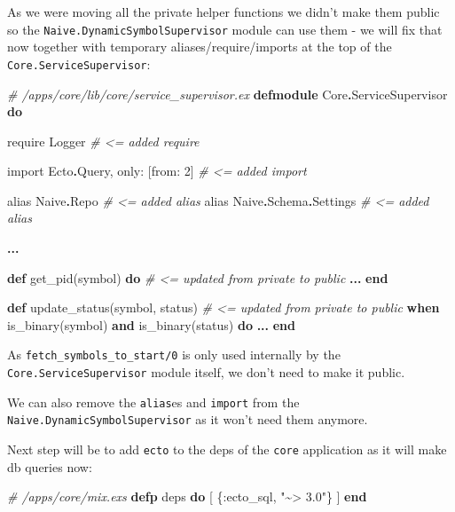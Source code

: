 \documentclass[
  oneside]{book}
\newenvironment{Shaded}{\begin{snugshade}}{\end{snugshade}}
\newcommand{\CommentTok}[1]{\textcolor[rgb]{0.56,0.35,0.01}{\textit{#1}}}
\newcommand{\ConstantTok}[1]{\textcolor[rgb]{0.00,0.00,0.00}{#1}}
\newcommand{\DecValTok}[1]{\textcolor[rgb]{0.00,0.00,0.81}{#1}}
\newcommand{\ImportTok}[1]{#1}
\newcommand{\KeywordTok}[1]{\textcolor[rgb]{0.13,0.29,0.53}{\textbf{#1}}}
\newcommand{\NormalTok}[1]{#1}
\newcommand{\OperatorTok}[1]{\textcolor[rgb]{0.81,0.36,0.00}{\textbf{#1}}}
\newcommand{\StringTok}[1]{\textcolor[rgb]{0.31,0.60,0.02}{#1}}
\newcommand{\VariableTok}[1]{\textcolor[rgb]{0.00,0.00,0.00}{#1}}
\begin{document}
As we were moving all the private helper functions we didn't make them public so the \texttt{Naive.DynamicSymbolSupervisor} module can use them - we will fix that now together with temporary aliases/require/imports at the top of the \texttt{Core.ServiceSupervisor}:

\begin{Shaded}
\begin{Highlighting}[]
\CommentTok{\# /apps/core/lib/core/service\_supervisor.ex}
\KeywordTok{defmodule} \ConstantTok{Core}\OperatorTok{.}\ConstantTok{ServiceSupervisor} \KeywordTok{do}

  \ImportTok{require} \ConstantTok{Logger}                     \CommentTok{\# \textless{}= added require}

  \ImportTok{import} \ConstantTok{Ecto}\OperatorTok{.}\ConstantTok{Query}\NormalTok{, }\VariableTok{only:}\NormalTok{ [}\VariableTok{from:} \DecValTok{2}\NormalTok{] }\CommentTok{\# \textless{}= added import}

  \ImportTok{alias} \ConstantTok{Naive}\OperatorTok{.}\ConstantTok{Repo}                   \CommentTok{\# \textless{}= added alias}
  \ImportTok{alias} \ConstantTok{Naive}\OperatorTok{.}\ConstantTok{Schema}\OperatorTok{.}\ConstantTok{Settings}        \CommentTok{\# \textless{}= added alias}

  \OperatorTok{...}

  \KeywordTok{def}\NormalTok{ get\_pid(symbol) }\KeywordTok{do} \CommentTok{\# \textless{}= updated from private to public}
    \OperatorTok{...}
  \KeywordTok{end}

  \KeywordTok{def}\NormalTok{ update\_status(symbol, status) }\CommentTok{\# \textless{}= updated from private to public}
      \KeywordTok{when}\NormalTok{ is\_binary(symbol) }\KeywordTok{and}\NormalTok{ is\_binary(status) }\KeywordTok{do}
    \OperatorTok{...}
  \KeywordTok{end}
\end{Highlighting}
\end{Shaded}

As \texttt{fetch\_symbols\_to\_start/0} is only used internally by the \texttt{Core.ServiceSupervisor} module itself, we don't need to make it public.

We can also remove the \texttt{alias}es and \texttt{import} from the \texttt{Naive.DynamicSymbolSupervisor} as it won't need them anymore.

Next step will be to add \texttt{ecto} to the deps of the \texttt{core} application as it will make db queries now:

\begin{Shaded}
\begin{Highlighting}[]
  \CommentTok{\# /apps/core/mix.exs}
  \KeywordTok{defp}\NormalTok{ deps }\KeywordTok{do}
\NormalTok{    [}
\NormalTok{      \{}\VariableTok{:ecto\_sql}\NormalTok{, }\StringTok{"\textasciitilde{}\textgreater{} 3.0"}\NormalTok{\}}
\NormalTok{    ]}
  \KeywordTok{end}
\end{Highlighting}
\end{Shaded}
\end{document}
